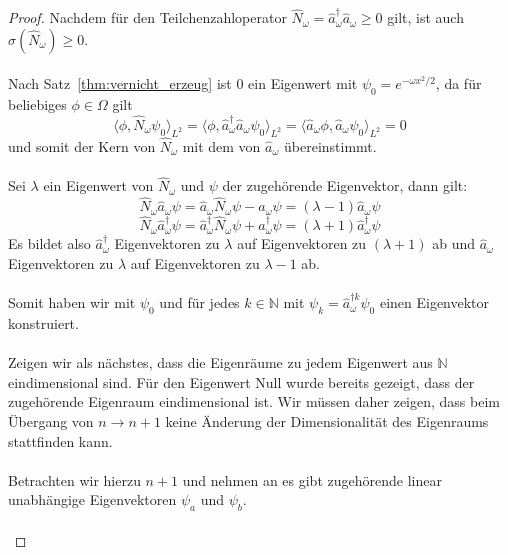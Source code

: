 \documentclass[11pt,a4paper,leqno]{report}
\numberwithin{equation}{chapter}
\begin{document}
\begin{proof}
	Nachdem f\"ur den Teilchenzahloperator $\hat{N}_\omega =\hat{a}^\dagger_\omega\hat{a}_\omega\geq 0$ gilt, ist auch $\sigma(\hat{N}_\omega)\geq 0$.\\
	\\
	Nach Satz~\ref{thm:vernicht_erzeug} ist $0$ ein Eigenwert mit $\psi_0=e^{-\omega x^2 / 2}$, da f\"ur beliebiges $\phi\in \Omega$ gilt
	\begin{equation*}
		\langle \phi, \hat{N}_\omega\psi_0\rangle_{L^2}=\langle \phi, \hat{a}^\dagger_\omega\hat{a}_\omega\psi_0\rangle_{L^2}=\langle \hat{a}_\omega\phi, \hat{a}_\omega\psi_0\rangle_{L^2}=0
	\end{equation*}
und somit der Kern von $\hat{N}_\omega$ mit dem von $\hat{a}_\omega$ \"ubereinstimmt.\\
\\
Sei $\lambda$ ein Eigenwert von $\hat{N}_\omega$ und $\psi$ der zugeh\"orende Eigenvektor, dann gilt:
\begin{equation*}
	\hat{N}_\omega\hat{a}_\omega\psi=\hat{a}_\omega\hat{N}_\omega\psi-\hat{a}_\omega\psi=(\lambda -1)\hat{a}_\omega\psi
\end{equation*}
\begin{equation*}
	\hat{N}_\omega\hat{a}_\omega^\dagger\psi=\hat{a}_\omega^\dagger\hat{N}_\omega\psi+\hat{a}_\omega^\dagger\psi=(\lambda +1)\hat{a}_\omega^\dagger\psi
\end{equation*}
Es bildet also $\hat{a}_\omega^\dagger$ Eigenvektoren zu $\lambda$ auf Eigenvektoren zu $(\lambda + 1)$ ab und $\hat{a}_\omega$ Eigenvektoren zu $\lambda $ auf Eigenvektoren zu $\lambda -1$ ab.\\
\\
Somit haben wir mit $\psi_0$ und f\"ur jedes $k\in\mathbb{N}$ mit $\psi_k= \hat{a}_\omega^{\dagger k}\psi_0$ einen Eigenvektor konstruiert.\\
\\
Zeigen wir als n\"achstes, dass die Eigenr\"aume zu jedem Eigenwert aus $\mathbb{N}$ eindimensional sind.
F\"ur den Eigenwert Null wurde bereits gezeigt, dass der zugeh\"orende Eigenraum eindimensional ist. Wir m\"ussen daher zeigen, dass beim \"Ubergang von $n\rightarrow n+1$ keine \"Anderung der Dimensionalit\"at des Eigenraums stattfinden kann.\\
\\
Betrachten wir hierzu $n+1$ und nehmen an es gibt  zugeh\"orende linear unabh\"angige Eigenvektoren $\psi_a$ und $\psi_b$.\\
\\

\end{proof}
\end{document}
